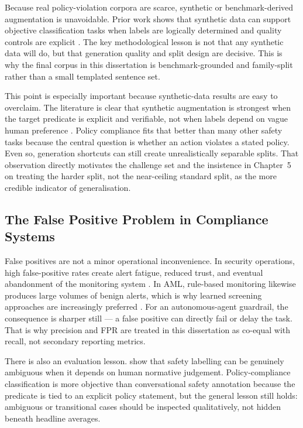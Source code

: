 \documentclass[12pt,a4paper]{article}
\begin{document}
Because real policy-violation corpora are scarce, synthetic or benchmark-derived
augmentation is unavoidable. Prior work shows that synthetic data can support
objective classification tasks when labels are logically determined and quality
controls are explicit \citep{anabytavor2020data,li2023synthetic,nadas2025synthetic}.
The key methodological lesson is not that any synthetic data will do, but that
generation quality and split design are decisive. This is why the final corpus
in this dissertation is benchmark-grounded and family-split rather than a small
templated sentence set.

This point is especially important because synthetic-data results are easy to
overclaim. The literature is clear that synthetic augmentation is strongest when
the target predicate is explicit and verifiable, not when labels depend on vague
human preference \citep{li2023synthetic,nadas2025synthetic}. Policy compliance
fits that better than many other safety tasks because the central question is
whether an action violates a stated policy. Even so, generation shortcuts can
still create unrealistically separable splits. That observation directly
motivates the challenge set and the insistence in Chapter~5 on treating the
harder split, not the near-ceiling standard split, as the more credible
indicator of generalisation.

\subsection{The False Positive Problem in Compliance Systems}

False positives are not a minor operational inconvenience. In security
operations, high false-positive rates create alert fatigue, reduced trust, and
eventual abandonment of the monitoring system \citep{alahmadi2022fps}. In AML,
rule-based monitoring likewise produces large volumes of benign alerts, which is
why learned screening approaches are increasingly preferred
\citep{ghimire2025aml}. For an autonomous-agent guardrail, the consequence is
sharper still --- a false positive can directly fail or delay the task. That is
why precision and FPR are treated in this dissertation as co-equal with recall,
not secondary reporting metrics.

There is also an evaluation lesson. \citet{movva2024annotation} show that safety
labelling can be genuinely ambiguous when it depends on human normative
judgement. Policy-compliance classification is more objective than
conversational safety annotation because the predicate is tied to an explicit
policy statement, but the general lesson still holds: ambiguous or transitional
cases should be inspected qualitatively, not hidden beneath headline averages.
\end{document}
